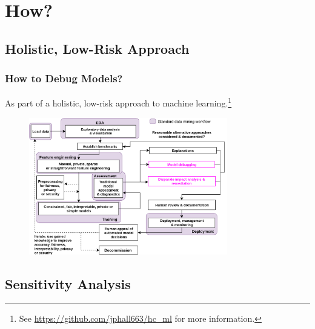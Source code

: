 \documentclass[11pt,
               aspectratio=43,
               hyperref={colorlinks}
               ]{beamer}
\begin{document}
	\section{How?}

		\subsection{Holistic, Low-Risk Approach}
	
			\begin{frame}
		
				\frametitle{How to Debug Models?}
		
				\footnotesize{As part of a holistic, low-risk approach to machine learning}.\footnote{\tiny{See \url{https://github.com/jphall663/hc_ml} for more information.}}
				\begin{figure}[htb]
					\begin{center}
						\includegraphics[height=170pt]{img/blueprint.png}
					\end{center}
				\end{figure}	
				\normalsize
		
			\end{frame}

		\subsection{Sensitivity Analysis}
\end{document}
